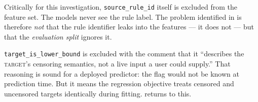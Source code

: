 Critically for this investigation, \texttt{source\_rule\_id} itself is
excluded from the feature set. The models never see the rule label. The
problem identified in  is therefore \emph{not} that the
rule identifier leaks into the features --- it does not --- but that the
\emph{evaluation split} ignores it.

\begin{limitbox}[title=One exclusion worth discussing with the panel]
\texttt{target\_is\_lower\_bound} is excluded with the comment that it
``describes the \textsc{target}'s censoring semantics, not a live input a
user could supply.'' That reasoning is sound for a deployed predictor:
the flag would not be known at prediction time. But it means the
regression objective treats censored and uncensored targets identically
during fitting.  returns to this.
\end{limitbox}
